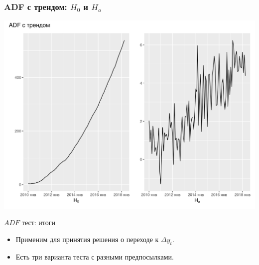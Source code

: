 \begin{frame}
  \frametitle{ADF с трендом: $H_0$ и $H_a$}
  \includegraphics[width=\textwidth]{pictures/om_ts_06-060.png}
\end{frame}


\begin{frame}{$ADF$ тест: итоги}

  \begin{itemize}[<+->]
    \item Применим для принятия решения о переходе к $\Delta y_t$.
    \item Есть три варианта теста с разными предпосылками.
  \end{itemize}
\end{frame}



